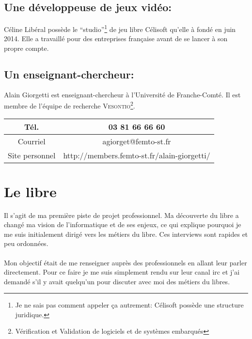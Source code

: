 \documentclass[a4paper,12pt, draft]{report}
\begin{document}
\subsection[Une développeuse de jeux vidéo]{Une développeuse de jeux vidéo: }
Céline Libéral possède le ``studio''\footnote{Je ne sais pas comment appeler ça autrement: Célisoft possède une structure juridique.} de jeu libre Célisoft qu'elle à fondé en juin 2014. Elle a travaillé pour des entreprises française avant de se lancer à son propre compte.

\subsection[Un enseignant-chercheur]{Un enseignant-chercheur:  }
Alain Giorgetti est enseignant-chercheur à l'Université de Franche-Comté. Il est membre de l'équipe de recherche \textsc{Vesontio}\footnote{Vérification et Validation de logiciels et de systèmes embarqués}.\\

\begin{tabular}{c|c}

    Tél. & 03 81 66 66 60\\
\hline
    Courriel & agiorget@femto-st.fr\\
\hline
    Site personnel & http://members.femto-st.fr/alain-giorgetti/\\

\end{tabular}

\section{Le libre}
\paragraph{}
Il s'agit de ma première piste de projet professionnel. Ma découverte du libre a changé ma vision de l'informatique et de ses enjeux, ce qui explique pourquoi je me suis initialement dirigé vers les métiers du libre. Ces interviews sont rapides et peu ordonnées.

\paragraph{}
Mon objectif était de me renseigner auprès des professionnels en allant leur parler directement. Pour ce faire je me suis simplement rendu sur leur canal irc et j'ai demandé s'il y avait quelqu'un pour discuter avec moi des métiers du libres. 
\end{document}
